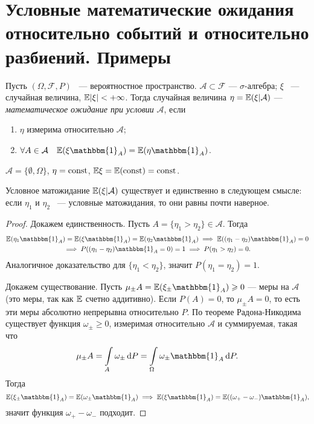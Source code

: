 \section{Условные математические ожидания относительно событий и относительно разбиений. Примеры}

\begin{definition}
    Пусть $(\Omega, \mathcal{F}, P)$ ~--- вероятностное пространство. $\mathcal{A}\subset\mathcal{F}$ ---
     $\sigma$-алгебра; $\xi$ ~--- случайная величина, $\mathbb{E} |\xi| < +\infty$.
     Тогда случайная величина $\eta = \mathbb{E} (\xi | \mathcal{A})$ --- \textit{математическое ожидание при условии} $\mathcal{A}$, если
     \begin{enumerate}
         \item $\eta$ измерима относительно $\mathcal{A}$;
         \item $\forall A\in\mathcal{A} \quad \EE (\xi \mathbbm{1}_A) = \EE (\eta\mathbbm{1}_A)$.
     \end{enumerate}
 \end{definition}

 \begin{example}
     $\mathcal{A} = \{\emptyset, \Omega\}$, $\eta = \mathrm{const}$, $\mathbb{E} \xi = \mathbb{E} (\mathrm{const}) = \mathrm{const}$.
 \end{example}

 \begin{theorem}\label{th:uslsuch}
     Условное матожидание $\mathbb{E} (\xi | \mathcal{A})$ существует и единственно в следующем смысле: если $\eta_1$ и $\eta_2$ ~--- условные матожидания, то они равны почти наверное.
 \end{theorem}

 \begin{proof}
     Докажем единственность. Пусть
     $A = \{\eta_1 > \eta_2\} \in\mathcal{A}$. Тогда
     \begin{multline*}
         \EE (\eta_1\mathbbm{1}_A) = \EE (\xi\mathbbm{1}_A) = \EE (\eta_2\mathbbm{1}_A) \Ra \EE ((\eta_1 - \eta_2)\mathbbm{1}_A) = 0 \\ \Ra P((\eta_1-\eta_2)\mathbbm{1}_A = 0) = 1 \Ra P(\eta_1 > \eta_2 ) = 0.
     \end{multline*}
   Аналогичное доказательство для $ \{\eta_1 < \eta_2\}$, значит $P(\eta_1 = \eta_2) = 1$.

    Докажем существование. Пусть
     $\mu_\pm A = \EE (\xi_\pm\mathbbm{1}_A)\ge 0$ --- меры на $\mathcal{A}$ (это меры, так как $\mathbb{E} $ счетно аддитивно).
     Если $P(A) = 0$, то $\mu_\pm A = 0$, то есть эти меры абсолютно непрерывна относительно $P$.
     По теореме Радона-Никодима существует функция $\omega_\pm \ge 0$, измеримая относительно $\mathcal{A}$ и суммируемая, такая что 
     $$\mu_\pm A = \int_A \omega_\pm \dd P =
         \int_\Omega \omega_\pm \mathbbm{1}_A \dd P.$$
    Тогда
    $$\EE (\xi_\pm \mathbbm{1}_A) = \EE (\omega_\pm \mathbbm{1}_A) \Ra \EE (\xi \mathbbm{1}_A) = \EE ((\omega_{+} - \omega_{-})\mathbbm{1}_A),$$ 
    значит функция $ \omega_{+} - \omega_{-}$ подходит.
 \end{proof}


